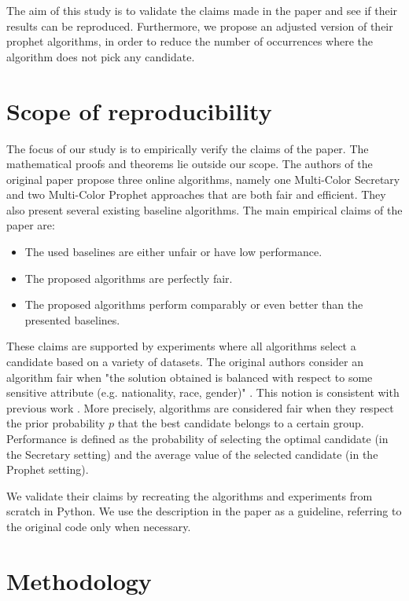 The aim of this study is to validate the claims made in the paper and see if their results can be reproduced. Furthermore, we propose an adjusted version of their prophet algorithms, in order to reduce the number of occurrences where the algorithm does not pick any candidate.

\section{Scope of reproducibility}
\label{sec:claims}
The focus of our study is to empirically verify the claims of the paper. The mathematical proofs and theorems lie outside our scope. The authors of the original paper propose three online algorithms, namely one Multi-Color Secretary and two Multi-Color Prophet approaches that are both fair and efficient. They also present several existing baseline algorithms. The main empirical claims of the paper are:

\begin{itemize}
    \item The used baselines are either unfair or have low performance.
    \item The proposed algorithms are perfectly fair.
    \item The proposed algorithms perform comparably or even better than the presented baselines.
\end{itemize}

These claims are supported by experiments where all algorithms select a candidate based on a variety of datasets. The original authors consider an algorithm fair when "the solution obtained is balanced with respect to some sensitive attribute (e.g. nationality, race, gender)" \citet{correa21}. This notion is consistent with previous work \citet{ Celis_a, Chierichetti2019}. More precisely, algorithms are considered fair when they respect the prior probability $p$ that the best candidate belongs to a certain group. Performance is defined as the probability of selecting the optimal candidate (in the Secretary setting) and the average value of the selected candidate (in the Prophet setting).

We validate their claims by recreating the algorithms and experiments from scratch in Python. We use the description in the paper as a guideline, referring to the original code only when necessary.

\section{Methodology}

